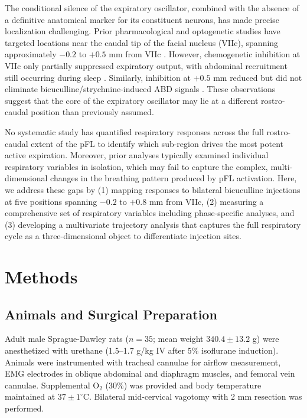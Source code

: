 \documentclass[12pt]{article}
\begin{document}
The conditional silence of the expiratory oscillator, combined with the absence of a definitive anatomical marker for its constituent neurons, has made precise localization challenging. Prior pharmacological and optogenetic studies have targeted locations near the caudal tip of the facial nucleus (VIIc), spanning approximately $-0.2$ to $+0.5$ mm from VIIc \citep{pagliardini2011active, huckstepp2015pfl}. However, chemogenetic inhibition at VIIc only partially suppressed expiratory output, with abdominal recruitment still occurring during sleep \citep{silva2016inhibition}. Similarly, inhibition at $+0.5$ mm reduced but did not eliminate bicuculline/strychnine-induced ABD signals \citep{anderson2016pfl}. These observations suggest that the core of the expiratory oscillator may lie at a different rostro-caudal position than previously assumed.

No systematic study has quantified respiratory responses across the full rostro-caudal extent of the pFL to identify which sub-region drives the most potent active expiration. Moreover, prior analyses typically examined individual respiratory variables in isolation, which may fail to capture the complex, multi-dimensional changes in the breathing pattern produced by pFL activation. Here, we address these gaps by (1) mapping responses to bilateral bicuculline injections at five positions spanning $-0.2$ to $+0.8$ mm from VIIc, (2) measuring a comprehensive set of respiratory variables including phase-specific analyses, and (3) developing a multivariate trajectory analysis that captures the full respiratory cycle as a three-dimensional object to differentiate injection sites.

\section{Methods}

\subsection{Animals and Surgical Preparation}

Adult male Sprague-Dawley rats ($n = 35$; mean weight $340.4 \pm 13.2$ g) were anesthetized with urethane (1.5--1.7 g/kg IV after 5\% isoflurane induction). Animals were instrumented with tracheal cannulae for airflow measurement, EMG electrodes in oblique abdominal and diaphragm muscles, and femoral vein cannulae. Supplemental O$_2$ (30\%) was provided and body temperature maintained at $37 \pm 1^\circ$C. Bilateral mid-cervical vagotomy with 2 mm resection was performed.
\end{document}
